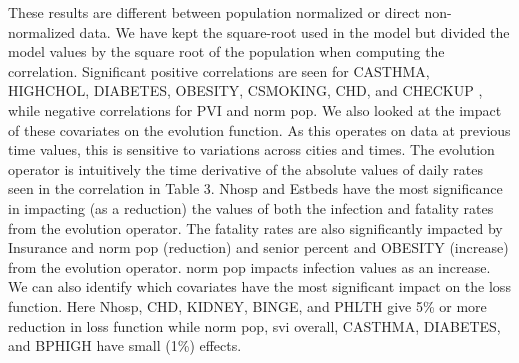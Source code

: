 \documentclass[12pt]{article}
\theoremstyle{definition}
\renewcommand{\_}{%
    \textunderscore\hspace{0pt}%
}
\begin{document}
These results are different between population normalized or direct
non-normalized data. We have kept the square-root used in the model
but divided the model values by the square root of the population when
computing the correlation. Significant positive correlations are seen
for CASTHMA, HIGHCHOL, DIABETES, OBESITY, CSMOKING, CHD, and CHECKUP
, while negative correlations for PVI and norm\_pop. We also looked at
the impact of these covariates on the evolution function. As this
operates on data at previous time values, this is sensitive to
variations across cities and times. The evolution operator is
intuitively the time derivative of the absolute values of daily rates
seen in the correlation in Table 3. Nhosp and Estbeds have the most
significance in impacting (as a reduction) the values of both the
infection and fatality rates from the evolution operator. The fatality
rates are also significantly impacted by Insurance and norm\_pop
(reduction) and senior\_percent and OBESITY (increase) from the
evolution operator. norm\_pop impacts infection values as an increase.
We can also identify which covariates have the most significant impact
on the loss function. Here Nhosp, CHD, KIDNEY, BINGE, and PHLTH give 5\%
or more reduction in loss function while norm\_pop, svi\_overall,
CASTHMA, DIABETES, and BPHIGH have small (1\%) effects.
\end{document}
